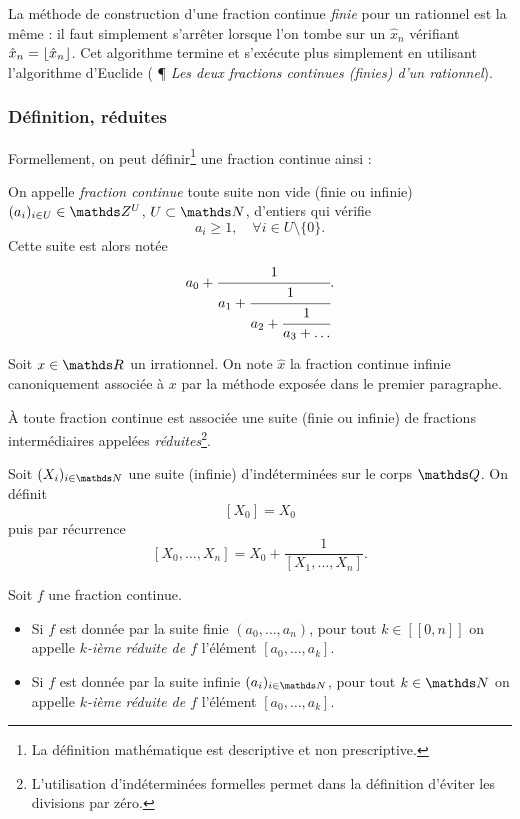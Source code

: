 \begin{remarque}
	La méthode de construction d'une fraction continue \emph{finie} pour un
	rationnel est la même : il faut simplement s'arrêter lorsque l'on tombe sur
	un $\hat{x}_n$ vérifiant $\hat{x}_n = \lfloor\hat{x}_n\rfloor$. Cet algorithme
	termine et s'exécute plus simplement en utilisant l'algorithme d'Euclide
	(\cite{wikiu} ¶ \emph{Les deux fractions continues (finies) d'un rationnel}).
\end{remarque}

\subsubsection{Définition, réduites}

Formellement, on peut définir\footnote{La définition mathématique est
descriptive et non prescriptive.} une fraction continue ainsi :

\begin{definition}\label{def-fracont}
	On appelle \emph{fraction continue} toute suite non vide (finie ou infinie)
	$(a_i)_{i\in U} \in \Z^U$, $U\subset \N$, d'entiers qui vérifie \[a_i
	\geq 1, \quad \forall i\in U\setminus\{0\}.\] Cette suite est alors notée
	\[a_0 + \cfrac{1}{a_1 + \cfrac{1}{a_2 + \cfrac{1}{a_3 + \dots}}}.\]
\end{definition}

\begin{notation}
	Soit $x\in \R$ un irrationnel. On note $\hat{x}$ la fraction continue
	infinie canoniquement associée à $x$ par la méthode exposée dans le premier
	paragraphe.
\end{notation}

À toute fraction continue est associée une suite (finie ou infinie) de
fractions \og intermédiaires \fg{} appelées
\emph{réduites}\footnote{L'utilisation d'indéterminées formelles permet dans la
définition d'éviter les divisions par zéro.}.

\begin{definition}
	Soit $(X_i)_{i\in \N}$ une suite (infinie) d'indéterminées sur le corps
	$\Q$. On définit \[[X_0] = X_0\] puis par récurrence \[[X_0, \dots,
	X_n] = X_0 + \frac{1}{[X_1, \dots, X_n]}.\]
\end{definition}

\begin{definition}
	Soit $f$ une fraction continue.
	\begin{itemize}
		\item Si $f$ est donnée par la suite finie $(a_0, \dots, a_n)$, pour
		tout $k\in [\![0, n]\!]$ on appelle \emph{$k$-ième réduite de $f$}
		l'élément $[a_0, \dots, a_k]$.
		\item Si $f$ est donnée par la suite infinie $(a_i)_{i\in \N}$, pour
		tout $k\in \N$ on appelle \emph{$k$-ième réduite de $f$} l'élément
		$[a_0, \dots, a_k]$.
	\end{itemize}
\end{definition}


